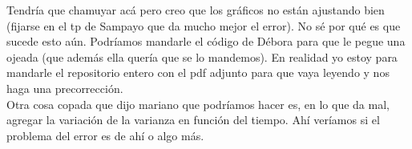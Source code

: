 
	Tendría que chamuyar acá pero creo que los gráficos no están ajustando bien (fijarse en el tp de Sampayo que da mucho mejor el error). No sé por qué es que sucede esto aún. Podríamos mandarle el código de Débora para que le pegue una ojeada (que además ella quería que se lo mandemos). En realidad yo estoy para mandarle el repositorio entero con el pdf adjunto para que vaya leyendo y nos haga una precorrección.\\
	\indent Otra cosa copada que dijo mariano que podríamos hacer es, en lo que da mal, agregar la variación de la varianza en función del tiempo. Ahí veríamos si el problema del error es de ahí o algo más.
